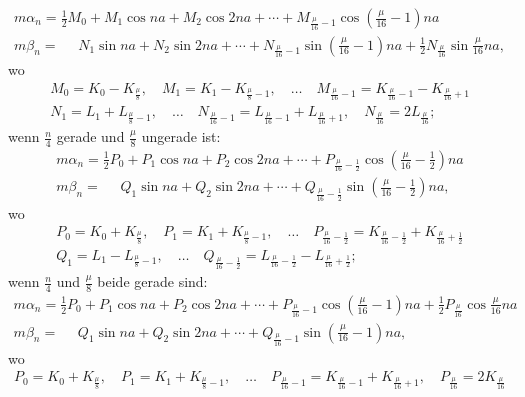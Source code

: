 \begin{landscape}
\[\begin{array}{l}
m\alpha_n = \tfrac{1}{2}M_0 + M_1\cos na + M_2\cos 2na + \cdots + M_{\frac{\mu}{16}-1}\cos\left(\frac{\mu}{16}-1\right)na \\[4pt]
m\beta_n = \phantom{{}={}} N_1\sin na + N_2\sin 2na + \cdots + N_{\frac{\mu}{16}-1}\sin\left(\frac{\mu}{16}-1\right)na + \tfrac{1}{2}N_{\frac{\mu}{16}}\sin\frac{\mu}{16}na,
\end{array}
\]
wo
\[
\begin{gathered}
M_0 = K_0 - K_{\frac{\mu}{8}}, \quad M_1 = K_1 - K_{\frac{\mu}{8}-1}, \quad \ldots \quad M_{\frac{\mu}{16}-1} = K_{\frac{\mu}{16}-1} - K_{\frac{\mu}{16}+1}\\[4pt]
N_1 = L_1 + L_{\frac{\mu}{8}-1}, \quad \ldots \quad N_{\frac{\mu}{16}-1} = L_{\frac{\mu}{16}-1} + L_{\frac{\mu}{16}+1}, \quad N_{\frac{\mu}{16}} = 2L_{\frac{\mu}{16}};
\end{gathered}
\]
wenn \(\frac{n}{4}\) gerade und \(\frac{\mu}{8}\) ungerade ist:
\[
\tag*{13)}
\begin{array}{l}
m\alpha_n = \tfrac{1}{2}P_0 + P_1\cos na + P_2\cos 2na + \cdots + P_{\frac{\mu}{16}-\frac{1}{2}}\cos\left(\frac{\mu}{16}-\frac{1}{2}\right)na \\[4pt]
m\beta_n = \phantom{{}={}} Q_1\sin na + Q_2\sin 2na + \cdots + Q_{\frac{\mu}{16}-\frac{1}{2}}\sin\left(\frac{\mu}{16}-\frac{1}{2}\right)na,
\end{array}
\]
wo
\[
\begin{gathered}
P_0 = K_0 + K_{\frac{\mu}{8}}, \quad P_1 = K_1 + K_{\frac{\mu}{8}-1}, \quad \ldots \quad P_{\frac{\mu}{16}-\frac{1}{2}} = K_{\frac{\mu}{16}-\frac{1}{2}} + K_{\frac{\mu}{16}+\frac{1}{2}}\\[4pt]
Q_1 = L_1 - L_{\frac{\mu}{8}-1}, \quad \ldots \quad Q_{\frac{\mu}{16}-\frac{1}{2}} = L_{\frac{\mu}{16}-\frac{1}{2}} - L_{\frac{\mu}{16}+\frac{1}{2}};
\end{gathered}
\]
wenn \(\frac{n}{4}\) und \(\frac{\mu}{8}\) beide gerade sind:
\[
\tag*{14)}
\begin{array}{l}
m\alpha_n = \tfrac{1}{2}P_0 + P_1\cos na + P_2\cos 2na + \cdots + P_{\frac{\mu}{16}-1}\cos\left(\frac{\mu}{16}-1\right)na + \tfrac{1}{2}P_{\frac{\mu}{16}}\cos\frac{\mu}{16}na \\[4pt]
m\beta_n = \phantom{{}={}} Q_1\sin na + Q_2\sin 2na + \cdots + Q_{\frac{\mu}{16}-1}\sin\left(\frac{\mu}{16}-1\right)na,
\end{array}
\]
wo
\[
\begin{gathered}
P_0 = K_0 + K_{\frac{\mu}{8}}, \quad P_1 = K_1 + K_{\frac{\mu}{8}-1}, \quad \ldots \quad P_{\frac{\mu}{16}-1} = K_{\frac{\mu}{16}-1} + K_{\frac{\mu}{16}+1}, \quad P_{\frac{\mu}{16}} = 2K_{\frac{\mu}{16}}\\[4pt]

\end{gathered}\]
\end{landscape}
